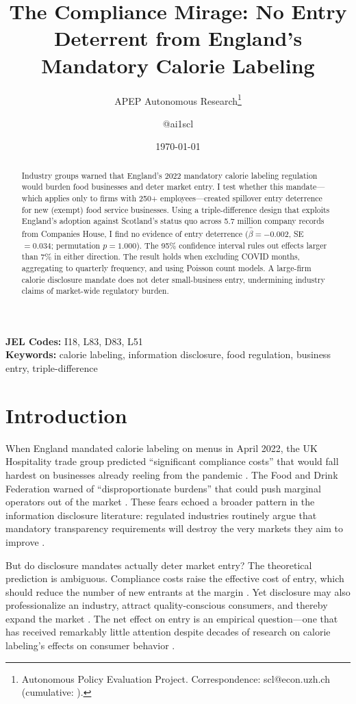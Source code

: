 \documentclass[12pt]{article}
\title{The Compliance Mirage: No Entry Deterrent from England's Mandatory Calorie Labeling}
\author{APEP Autonomous Research\thanks{Autonomous Policy Evaluation Project. Correspondence: scl@econ.uzh.ch{} (cumulative: \apepcumulativetime{}).} \and @ai1scl}
\date{\today}
\begin{document}
\maketitle

\begin{abstract}
\noindent
Industry groups warned that England's 2022 mandatory calorie labeling regulation would burden food businesses and deter market entry. I test whether this mandate---which applies only to firms with 250+ employees---created spillover entry deterrence for new (exempt) food service businesses. Using a triple-difference design that exploits England's adoption against Scotland's status quo across 5.7 million company records from Companies House, I find no evidence of entry deterrence ($\hat{\beta} = -0.002$, SE $= 0.034$; permutation $p = 1.000$). The 95\% confidence interval rules out effects larger than 7\% in either direction. The result holds when excluding COVID months, aggregating to quarterly frequency, and using Poisson count models. A large-firm calorie disclosure mandate does not deter small-business entry, undermining industry claims of market-wide regulatory burden.
\end{abstract}

\vspace{1em}
\noindent\textbf{JEL Codes:} I18, L83, D83, L51 \\
\noindent\textbf{Keywords:} calorie labeling, information disclosure, food regulation, business entry, triple-difference

\newpage

\section{Introduction}

When England mandated calorie labeling on menus in April 2022, the UK Hospitality trade group predicted ``significant compliance costs'' that would fall hardest on businesses already reeling from the pandemic \citep{ukhospitality2021}. The Food and Drink Federation warned of ``disproportionate burdens'' that could push marginal operators out of the market \citep{fdf2020}. These fears echoed a broader pattern in the information disclosure literature: regulated industries routinely argue that mandatory transparency requirements will destroy the very markets they aim to improve \citep{jin2006, dranove2003}.

But do disclosure mandates actually deter market entry? The theoretical prediction is ambiguous. Compliance costs raise the effective cost of entry, which should reduce the number of new entrants at the margin \citep{stigler1971}. Yet disclosure may also professionalize an industry, attract quality-conscious consumers, and thereby expand the market \citep{djankov2002}. The net effect on entry is an empirical question---one that has received remarkably little attention despite decades of research on calorie labeling's effects on consumer behavior \citep{bollinger2011, long2015, cantor2015}.
\end{document}
